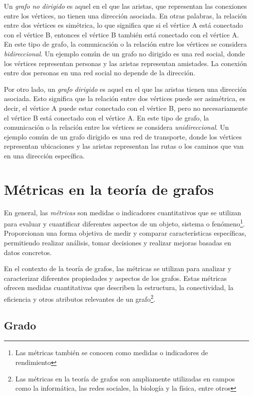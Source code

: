 Un \textit{grafo no dirigido} es aquel en el que las aristas, que representan las conexiones
entre los vértices, no tienen una dirección asociada. En otras palabras, la relación entre dos
vértices es simétrica, lo que significa que si el vértice A está conectado con el vértice B,
entonces el vértice B también está conectado con el vértice A. En este tipo de grafo, la comunicación
o la relación entre los vértices se considera \textit{bidireccional}. Un ejemplo común de un grafo no
dirigido es una red social, donde los vértices representan personas y las aristas representan
amistades. La conexión entre dos personas en una red social no depende de la dirección.

Por otro lado, un \textit{grafo dirigido} es aquel en el que las aristas tienen una dirección
asociada. Esto significa que la relación entre dos vértices puede ser asimétrica, es decir, el
vértice A puede estar conectado con el vértice B, pero no necesariamente el vértice B está conectado
con el vértice A. En este tipo de grafo, la comunicación o la relación entre los vértices se considera
\textit{unidireccional}. Un ejemplo común de un grafo dirigido es una red de transporte, donde los
vértices representan ubicaciones y las aristas representan las rutas o los caminos que van en una
dirección específica.

\section{Métricas en la teoría de grafos}

En general, las \textit{métricas} son medidas o indicadores cuantitativos que se utilizan para evaluar
y cuantificar diferentes aspectos de un objeto, sistema o fenómeno\footnote{Las métricas también
    se conocen como medidas o indicadores de rendimiento}. Proporcionan una forma objetiva de medir y
comparar características específicas, permitiendo realizar análisis, tomar decisiones y realizar
mejoras basadas en datos concretos.

En el contexto de la teoría de grafos, las métricas se utilizan para analizar y caracterizar diferentes
propiedades y aspectos de los grafos. Estas métricas ofrecen medidas cuantitativas que describen la
estructura, la conectividad, la eficiencia y otros atributos relevantes de un grafo\footnote{
    Las métricas en la teoría de grafos son ampliamente utilizadas en campos como la informática, las
    redes sociales, la biología y la física, entre otros}.

\subsection{Grado}

